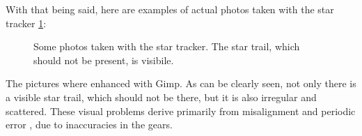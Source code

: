 \documentclass[]{article}
\begin{document}
With that being said, here are examples of actual photos taken with the star tracker \ref{fig:startrackerresult}:

\begin{figure}[H]
	\centering
	\caption{Some photos taken with the star tracker. The star trail, which should not be present, is visibile.  }
	\label{fig:startrackerresult}
\end{figure}

The pictures where enhanced with Gimp. As can be clearly seen, not only there is a visible star trail, which should not be there, but it is also irregular and scattered. These visual problems derive primarily from misalignment and periodic error \cite{fieldrotation}, due to inaccuracies in the gears.
\end{document}
